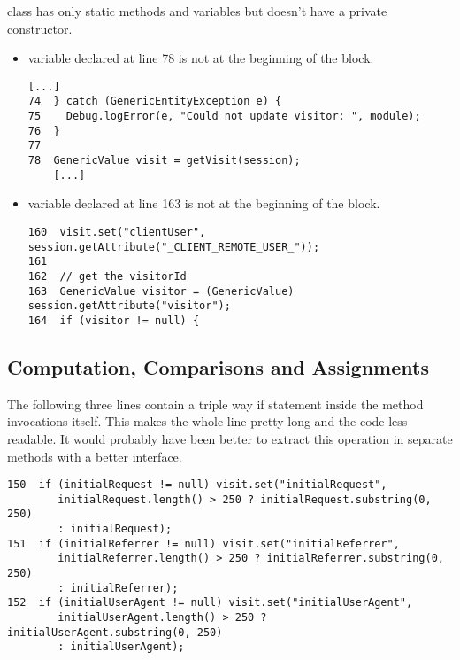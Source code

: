      class has only static methods and variables but doesn't
    have a private constructor.

\begin{itemize}
    \item
         variable declared at line 78 is not at the beginning of the block.\\
        \begin{lstlisting}[basicstyle=\small\ttfamily,columns=fullflexible]
    [...]
74  } catch (GenericEntityException e) {
75    Debug.logError(e, "Could not update visitor: ", module);
76  }
77
78  GenericValue visit = getVisit(session);
    [...]
        \end{lstlisting}
    \item
         variable declared at line 163 is not at the beginning of the block.\\
        \begin{lstlisting}[basicstyle=\small\ttfamily,columns=fullflexible]
160  visit.set("clientUser", session.getAttribute("_CLIENT_REMOTE_USER_"));
161  
162  // get the visitorId
163  GenericValue visitor = (GenericValue) session.getAttribute("visitor");
164  if (visitor != null) {
        \end{lstlisting}
\end{itemize}

\subsection{Computation, Comparisons and Assignments}

    The following three lines contain a triple way if statement inside the method
    invocations itself. This makes the whole line pretty long and the code less readable.
    It would probably have been better to extract this operation in separate methods
    with a better interface.

    \begin{lstlisting}[basicstyle=\small\ttfamily,columns=fullflexible]
150  if (initialRequest != null) visit.set("initialRequest",
        initialRequest.length() > 250 ? initialRequest.substring(0, 250)
        : initialRequest);
151  if (initialReferrer != null) visit.set("initialReferrer",
        initialReferrer.length() > 250 ? initialReferrer.substring(0, 250)
        : initialReferrer);
152  if (initialUserAgent != null) visit.set("initialUserAgent",
        initialUserAgent.length() > 250 ? initialUserAgent.substring(0, 250)
        : initialUserAgent);
    \end{lstlisting}

